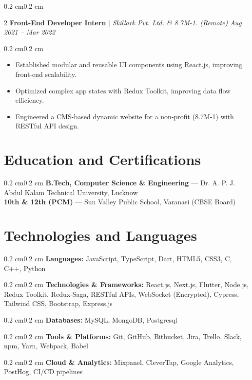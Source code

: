 \documentclass[10pt, letterpaper]{article}
\newenvironment{highlights}{\begin{itemize}[topsep=0 cm,parsep=0 cm,partopsep=0pt,itemsep=0pt,leftmargin=0.4 cm + 10pt]}{\end{itemize}}
\newenvironment{onecolentry}{\begin{adjustwidth}{0.2 cm}{0.2 cm}\linespread{1.2}\selectfont}{\end{adjustwidth}}
\newenvironment{twocolentry}[2][]{\onecolentry\def\secondColumn{#2}\setcolumnwidth{\fill, 4.5 cm}\begin{paracol}{2}}{\switchcolumn \raggedleft \secondColumn\end{paracol}\endonecolentry}
\newcommand{\aftersectionspace}{\vspace{4pt}}
\begin{document}
\aftersectionspace
\begin{twocolentry}{\textit{Aug 2021 – Mar 2022}}
\textbf{Front-End Developer Intern} $|$ \textit{Skillark Pvt. Ltd. \& 8.7M-1. (Remote)}
\end{twocolentry}
\begin{onecolentry}
\begin{highlights}
\item Established modular and reusable UI components using React.js, improving front-end scalability.
\item Optimized complex app states with Redux Toolkit, improving data flow efficiency.
\item Engineered a CMS-based dynamic website for a non-profit (8.7M-1) with RESTful API design.
\end{highlights}
\end{onecolentry}

\section{Education and Certifications}
\begin{onecolentry}
\textbf{B.Tech, Computer Science \& Engineering} — Dr. A. P. J. Abdul Kalam Technical University, Lucknow\\
\textbf{10th \& 12th (PCM)} — Sun Valley Public School, Varanasi (CBSE Board)
\end{onecolentry}

\section{Technologies and Languages}
\begin{onecolentry}
\textbf{Languages:} JavaScript, TypeScript, Dart, HTML5, CSS3, C, C++, Python
\end{onecolentry}
\begin{onecolentry}
\textbf{Technologies \& Frameworks:} React.js, Next.js, Flutter, Node.js, Redux Toolkit, Redux-Saga, RESTful APIs, WebSocket (Encrypted), Cypress, Tailwind CSS, Bootstrap, Express.js
\end{onecolentry}
\begin{onecolentry}
\textbf{Databases:} MySQL, MongoDB, Postgresql
\end{onecolentry}
\begin{onecolentry}
\textbf{Tools \& Platforms:} Git, GitHub, Bitbucket, Jira, Trello, Slack, npm, Yarn, Webpack, Babel
\end{onecolentry}
\begin{onecolentry}
\textbf{Cloud \& Analytics:} Mixpanel, CleverTap, Google Analytics, PostHog, CI/CD pipelines
\end{onecolentry}
\end{document}
